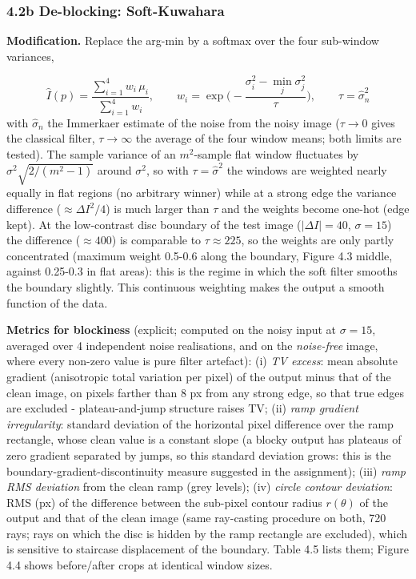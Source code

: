\documentclass[10pt,a4paper]{article}
\begin{document}
\subsubsection{4.2b De-blocking: Soft-Kuwahara}
\textbf{Modification.} Replace the arg-min by a softmax over the four sub-window variances,

\begin{equation}\hat I(p)=\frac{\sum_{i=1}^{4}w_i\,\mu_i}{\sum_{i=1}^{4}w_i},\qquad w_i=\exp\!\Big(-\frac{\sigma_i^2-\min_j\sigma_j^2}{\tau}\Big),\qquad \tau=\hat\sigma_{n}^{2}\end{equation}
with $\hat\sigma_n$ the Immerkaer estimate of the noise from the noisy image ($\tau\to0$ gives the classical filter, $\tau\to\infty$ the average of the four window means; both limits are tested). The sample variance of an $m^2$-sample flat window fluctuates by $\sigma^2\sqrt{2/(m^2-1)}$ around $\sigma^2$, so with $\tau=\hat\sigma^2$ the windows are weighted nearly equally in flat regions (no arbitrary winner) while at a strong edge the variance difference ($\approx\Delta I^2/4$) is much larger than $\tau$ and the weights become one-hot (edge kept). At the low-contrast disc boundary of the test image ($|\Delta I|=40$, $\sigma=15$) the difference ($\approx400$) is comparable to $\tau\approx225$, so the weights are only partly concentrated (maximum weight 0.5-0.6 along the boundary, Figure 4.3 middle, against 0.25-0.3 in flat areas): this is the regime in which the soft filter smooths the boundary slightly. This continuous weighting makes the output a smooth function of the data.

\textbf{Metrics for blockiness} (explicit; computed on the noisy input at $\sigma=15$, averaged over 4 independent noise realisations, and on the \textit{noise-free} image, where every non-zero value is pure filter artefact): (i) \textit{TV excess}: mean absolute gradient (anisotropic total variation per pixel) of the output minus that of the clean image, on pixels farther than 8 px from any strong edge, so that true edges are excluded - plateau-and-jump structure raises TV; (ii) \textit{ramp gradient irregularity}: standard deviation of the horizontal pixel difference over the ramp rectangle, whose clean value is a constant slope (a blocky output has plateaus of zero gradient separated by jumps, so this standard deviation grows: this is the boundary-gradient-discontinuity measure suggested in the assignment); (iii) \textit{ramp RMS deviation} from the clean ramp (grey levels); (iv) \textit{circle contour deviation}: RMS (px) of the difference between the sub-pixel contour radius $r(\theta)$ of the output and that of the clean image (same ray-casting procedure on both, 720 rays; rays on which the disc is hidden by the ramp rectangle are excluded), which is sensitive to staircase displacement of the boundary. Table 4.5 lists them; Figure 4.4 shows before/after crops at identical window sizes.
\end{document}
